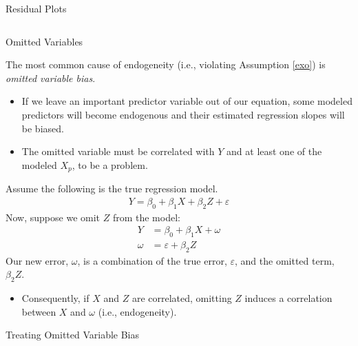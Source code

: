 \documentclass[10pt]{beamer}\usepackage[]{graphicx}\usepackage[]{color}
\newenvironment{knitrout}{}{} %
\begin{document}
{\begin{frame}{Residual Plots}
\begin{columns}
\begin{column}{0.5\textwidth}
\begin{knitrout}
{}


\end{knitrout}

\end{column}
\end{columns}

\end{frame}

\watermarkon %

\begin{frame}[allowframebreaks]{Omitted Variables}

  The most common cause of endogeneity (i.e., violating Assumption \ref{exo}) is
  \emph{omitted variable bias}.
  \vb
  \begin{itemize}
  \item If we leave an important predictor variable out of our equation, some
    modeled predictors will become endogenous and their estimated regression
    slopes will be biased.
    \vb
  \item The omitted variable must be correlated with $Y$ and at least one of the
    modeled $X_p$, to be a problem.
  \end{itemize}

  \pagebreak

  Assume the following is the true regression model.
  \begin{align*}
    Y = \beta_0 + \beta_1X + \beta_2Z + \varepsilon
  \end{align*}
  Now, suppose we omit $Z$ from the model:
  \begin{align*}
    Y &= \beta_0 + \beta_1X + \omega\\
    \omega &= \varepsilon + \beta_2Z
  \end{align*}
  Our new error, $\omega$, is a combination of the true error, $\varepsilon$,
  and the omitted term, $\beta_2Z$.
  \begin{itemize}
  \item Consequently, if $X$ and $Z$ are correlated, omitting $Z$ induces a
    correlation between $X$ and $\omega$ (i.e., endogeneity).
  \end{itemize}

\end{frame}


\begin{frame}{Treating Omitted Variable Bias}


\end{frame}}
\end{document}
